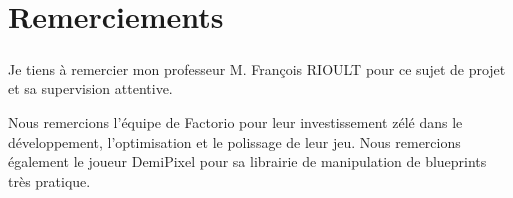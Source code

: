 \chapter*{Remerciements}
\paragraph{} 
Je tiens à remercier mon professeur M. François RIOULT pour ce sujet de projet et sa supervision attentive.


Nous remercions l'équipe de Factorio pour leur investissement zélé dans le développement, l'optimisation et le polissage de leur jeu.
Nous remercions également le joueur DemiPixel pour sa librairie de manipulation de blueprints très pratique.